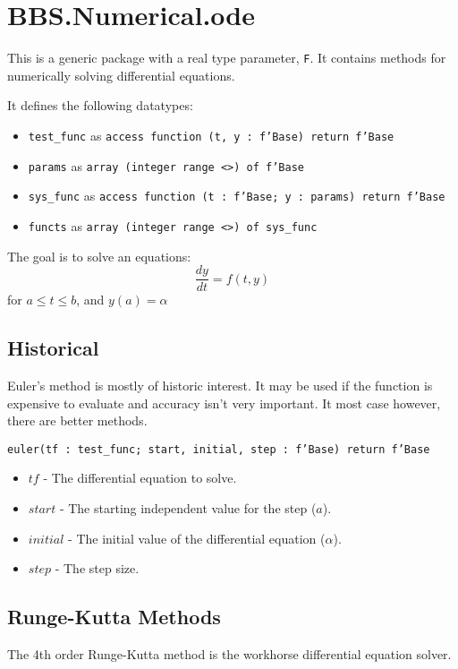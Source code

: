 \documentclass[10pt, openany]{book}
\newcommand{\function}[1]{\texttt{#1}}
\newcommand{\datatype}[1]{\texttt{#1}}
\begin{document}
\section{BBS.Numerical.ode}
This is a generic package with a real type parameter, \datatype{F}.  It contains methods for numerically solving differential equations.

It defines the following datatypes:
\begin{itemize}
   \item \datatype{test\_func} as \datatype{access function (t, y : f'Base) return f'Base}
   \item \datatype{params} as \datatype{array (integer range <>) of f'Base}
   \item \datatype{sys\_func} as \datatype{access function (t : f'Base; y : params) return f'Base}
   \item \datatype{functs} as \datatype{array (integer range <>) of sys\_func}
\end{itemize}

The goal is to solve an equations:
\begin{displaymath}
  \frac{dy}{dt} = f(t, y)
\end{displaymath}
 for $a\leq t\leq b$, and $y(a) = \alpha$
 
\subsection{Historical}
Euler's method is mostly of historic interest.  It may be used if the function is expensive to evaluate and accuracy isn't very important.  It most case however, there are better methods.

\function{euler(tf : test\_func; start, initial, step : f'Base) return f'Base}
\begin{itemize}
  \item $tf$ - The differential equation to solve.
  \item $start$ - The starting independent value for the step ($a$).
  \item $initial$ - The initial value of the differential equation ($\alpha$).
  \item $step$ - The step size.
\end{itemize}

\subsection{Runge-Kutta Methods}
The 4th order Runge-Kutta method is the workhorse differential equation solver.
\end{document}

